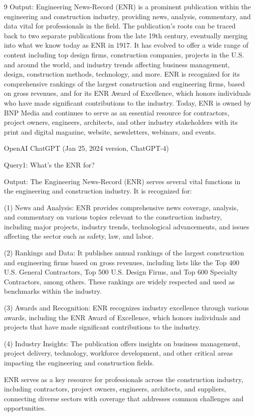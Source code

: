 \documentclass{mcmthesis}
\begin{document}
\begin{ReportAiUse}{9}
Output: Engineering News-Record (ENR) is a prominent publication within the engineering and
construction industry, providing news, analysis, commentary, and data vital for professionals
in the field. The publication's roots can be traced back to two separate publications from the
late 19th century, eventually merging into what we know today as ENR in 1917. It has evolved
to offer a wide range of content including top design firms, construction companies, projects
in the U.S. and around the world, and industry trends affecting business management, design,
construction methods, technology, and more. ENR is recognized for its comprehensive rankings
of the largest construction and engineering firms, based on gross revenues, and for its ENR
Award of Excellence, which honors individuals who have made significant contributions to the
industry. Today, ENR is owned by BNP Media and continues to serve as an essential resource
for contractors, project owners, engineers, architects, and other industry stakeholders with its
print and digital magazine, website, newsletters, webinars, and events.

OpenAI ChatGPT (Jan 25, 2024 version, ChatGPT-4)

Query1: What's the ENR for?

Output: The Engineering News-Record (ENR) serves several vital functions in the engineering and construction industry. It is recognized for:

(1) News and Analysis: ENR provides comprehensive news coverage, analysis, and commentary
on various topics relevant to the construction industry, including major projects, industry
trends, technological advancements, and issues affecting the sector such as safety, law,
and labor.

(2) Rankings and Data: It publishes annual rankings of the largest construction and engineering
firms based on gross revenues, including lists like the Top 400 U.S. General Contractors,
Top 500 U.S. Design Firms, and Top 600 Specialty Contractors, among others. These
rankings are widely respected and used as benchmarks within the industry.

(3) Awards and Recognition: ENR recognizes industry excellence through various awards,
including the ENR Award of Excellence, which honors individuals and projects that have made
significant contributions to the industry.

(4) Industry Insights: The publication offers insights on business management, project
delivery, technology, workforce development, and other critical areas impacting the engineering
and construction fields.

ENR serves as a key resource for professionals across the construction industry, including
contractors, project owners, engineers, architects, and suppliers, connecting diverse sectors
with coverage that addresses common challenges and opportunities.

\end{ReportAiUse}
\end{document}
